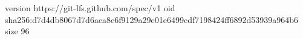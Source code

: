 version https://git-lfs.github.com/spec/v1
oid sha256:d7d4db8067d7d6aea8e6f9129a29e01e6499cdf7198424ff6892d53939a964b6
size 96
